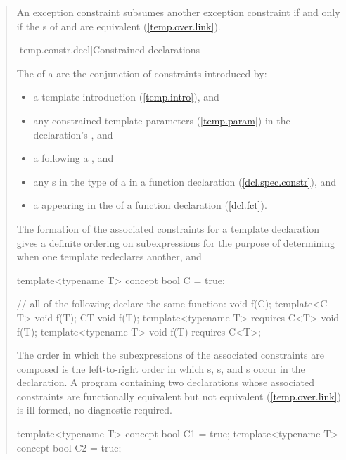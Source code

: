 \begin{quote}
\pnum
An exception constraint  subsumes another
exception constraint  if and only if the
s of 
and  are equivalent 
(\ref{temp.over.link}).


[temp.constr.decl]{Constrained declarations}

\pnum
The  of a  are 
the conjunction of constraints introduced by:
% 
\begin{itemize}
\item a template introduction (\ref{temp.intro}), and

\item any constrained template parameters (\ref{temp.param}) in the 
declaration's , and

\item a  following a
, and

\item any s in the type of a 
 in a function declaration 
(\ref{dcl.spec.constr}), and

\item a  appearing in the  
of a function declaration (\ref{dcl.fct}).
\end{itemize}
% 
The formation of the associated constraints for a template declaration
gives a definite ordering on subexpressions for the purpose of determining
when one template redeclares another, and 

\enterexample
\begin{codeblock}
template<typename T> concept bool C = true;

// all of the following declare the same function:
void f(C);
template<C T> void f(T);
C{T} void f(T);
template<typename T> requires C<T> void f(T);
template<typename T> void f(T) requires C<T>;
\end{codeblock}
\exitexample

\pnum
The order in which the subexpressions of the associated constraints
are composed is the left-to-right order in which 
s,
s, and
s occur in the declaration.
% 
\enternote
A program containing two declarations whose associated constraints are 
functionally equivalent but not equivalent (\ref{temp.over.link}) is 
ill-formed, no diagnostic required.
\exitnote
% 
\enterexample
\begin{codeblock}
template<typename T> concept bool C1 = true;
template<typename T> concept bool C2 = true;


\end{codeblock}
\end{quote}
